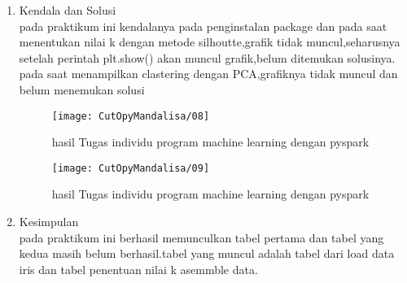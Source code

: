 \begin{enumerate}
\item Kendala dan Solusi\\
pada praktikum ini kendalanya pada penginstalan package dan pada saat menentukan nilai k dengan metode silhoutte,grafik tidak muncul,seharusnya setelah perintah plt.show() akan muncul grafik,belum ditemukan solusinya. pada saat menampilkan clastering dengan PCA,grafiknya tidak muncul dan belum menemukan solusi

\begin{figure}[!ht]
\texttt{[image: CutOpyMandalisa/08]}
\caption{hasil Tugas individu program machine learning dengan pyspark }
\label{gam:perkuliahan-05-01}
\end{figure}

\begin{figure}[!ht]
\texttt{[image: CutOpyMandalisa/09]}
\caption{hasil Tugas individu program machine learning dengan pyspark }
\label{gam:perkuliahan-05-01}
\end{figure}

\item Kesimpulan\\
pada praktikum ini berhasil memunculkan tabel pertama dan tabel yang kedua masih belum berhasil.tabel yang muncul adalah tabel dari load data iris dan tabel penentuan nilai k asemmble data.
\end{enumerate}